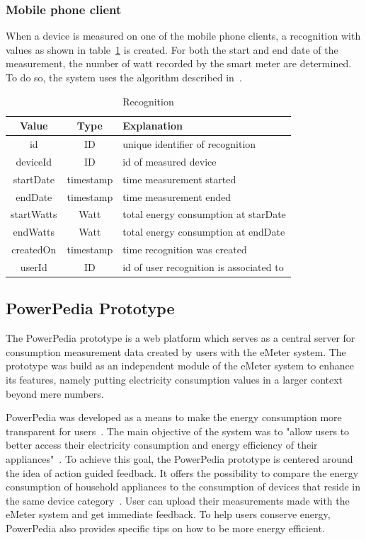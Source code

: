 \subsubsection{Mobile phone client}
When a device is measured on one of the mobile phone clients, a recognition with values as shown in table~\ref{recognition} is created. For both the start and end date of the measurement, the number of watt recorded by the smart meter are determined. To do so, the system uses the algorithm described in~\cite{weiss:inprocPUC:2012}. 

\begin{table}[htdp]
\caption{Recognition}
\begin{center}
\begin{tabular}{|c|c|p{5cm}|}
\hline
Value & Type & Explanation\\
\hline
\hline
id & ID & unique identifier of recognition \\
\hline
deviceId & ID & id of measured device \\ 
\hline
startDate & timestamp & time measurement started \\
\hline
endDate & timestamp & time measurement ended\\
\hline
startWatts & Watt & total energy consumption at starDate  \\
\hline
endWatts & Watt & total energy consumption at endDate \\
\hline
createdOn & timestamp & time recognition was created\\
\hline
userId & ID & id of user recognition is associated to \\
\hline
\end{tabular}
\end{center}
\label{recognition}
\end{table}%


\subsection{PowerPedia Prototype}
The PowerPedia prototype is a web platform which serves as a central server for consumption measurement data created by users with the eMeter system. The prototype was build as an independent module of the eMeter system to enhance its features, namely putting electricity consumption values in a larger context beyond mere numbers.

PowerPedia was developed as a means to make the energy consumption more transparent for users~\cite{merklepp}. The main objective of the system was to "allow users to better access their electricity consumption and energy efficiency of their appliances"~\cite{weiss:inprocPUC:2012}. To achieve this goal, the PowerPedia prototype is centered around the idea of action guided feedback. It offers the possibility to compare the energy consumption of household appliances to the consumption of devices that reside in the same device category~\cite{merklepp}. User can upload their measurements made with the eMeter system and get immediate feedback. To help users conserve energy, PowerPedia also provides specific tips on how to be more energy efficient.

